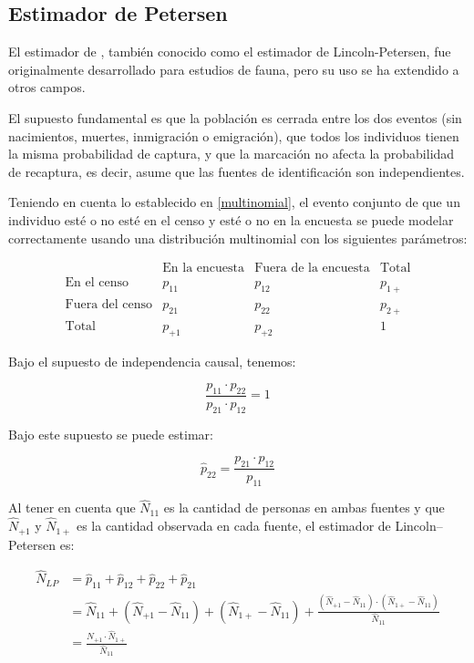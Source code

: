 \documentclass[
  12pt,
]{book}
\begin{document}
\subsection{Estimador de Petersen}\label{estimador-de-petersen}

El estimador de \citet{petersen1896}, también conocido como el estimador de Lincoln-Petersen, fue originalmente desarrollado para estudios de fauna, pero su uso se ha extendido a otros campos.

El supuesto fundamental es que la población es cerrada entre los dos eventos (sin nacimientos, muertes, inmigración o emigración), que todos los individuos tienen la misma probabilidad de captura, y que la marcación no afecta la probabilidad de recaptura, es decir, asume que las fuentes de identificación son independientes.

Teniendo en cuenta lo establecido en \ref{multinomial}, el evento conjunto de que un individuo esté o no esté en el censo y esté o no en la encuesta se puede modelar correctamente usando una distribución multinomial con los siguientes parámetros:

\[
    \begin{array}{c|cc|c}
    & \text{En la encuesta} & \text{Fuera de la encuesta} & \text{Total} \\
    \hline
    \text{En el censo} & p_{11} & p_{12} & p_{1+} \\
    \text{Fuera del censo} & p_{21} & p_{22} & p_{2+} \\
    \hline
    \text{Total} & p_{+1} & p_{+2} & 1
    \end{array}
    \]

Bajo el supuesto de independencia causal, tenemos:

\[\frac{p_{11} \cdot p_{22}}{p_{21} \cdot  p_{12}} = 1\]

Bajo este supuesto se puede estimar:

\[ \hat{p}_{22} = \frac{p_{21}\cdot p_{12}}{p_{11}} \]

Al tener en cuenta que \(\hat{N}_{11}\) es la cantidad de personas en ambas fuentes y que \(\hat{N}_{+1}\) y \(\hat{N}_{1+}\) es la cantidad observada en cada fuente, el estimador de Lincoln--Petersen es:

\begin{align}
\hat{N}_{LP} &= \hat{p}_{11} + \hat{p}_{12} + \hat{p}_{22} + \hat{p}_{21} \\ 
             &= \hat{N}_{11} + (\hat{N}_{+1} - \hat{N}_{11}) + (\hat{N}_{1+} - \hat{N}_{11}) + \frac{(\hat{N}_{+1} - \hat{N}_{11}) \cdot (\hat{N}_{1+} - \hat{N}_{11})}{\hat{N}_{11}} \\
             &= \frac{\hat{N}_{+1} \cdot \hat{N}_{1+}}{\hat{N}_{11}}
\end{align}
\end{document}
